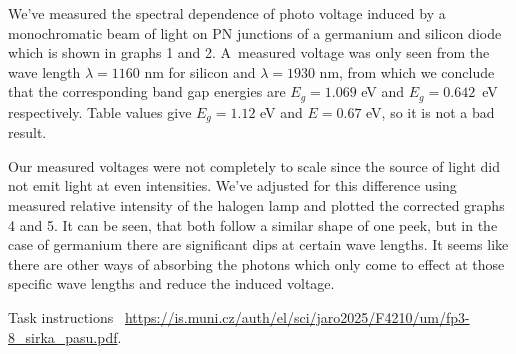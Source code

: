 \documentclass[a4paper,11pt]{article}
\begin{document}
We've measured the spectral dependence of photo voltage induced by a monochromatic beam of light on PN junctions of a germanium and silicon diode which is shown in graphs 1 and 2. A~measured voltage was only seen from the wave length $ \lambda = 1160 $ nm for silicon and $ \lambda = 1930 $ nm, from which we conclude that the corresponding band gap energies are $ E_g = 1.069 $ eV and $ E_g = 0.642 $~eV respectively. Table values give $ E_g = 1.12 $ eV and $ E = 0.67 $ eV, so it is not a bad result.

Our measured voltages were not completely to scale since the source of light did not emit light at even intensities. We've adjusted for this difference using measured relative intensity of the halogen lamp and plotted the corrected graphs 4 and 5. It can be seen, that both follow a similar shape of one peek, but in the case of germanium there are significant dips at certain wave lengths. It seems like there are other ways of absorbing the photons which only come to effect at those specific wave lengths and reduce the induced voltage. 


\begin{thebibliography}{0}
 Task instructions ~\url{https://is.muni.cz/auth/el/sci/jaro2025/F4210/um/fp3-8_sirka_pasu.pdf}.   
\end{thebibliography}
\end{document}
